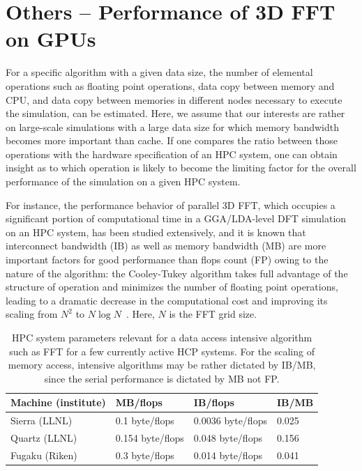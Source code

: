 
\section{Others -- Performance of 3D FFT on GPUs}
\label{sec:hpc}

For a specific algorithm with a given data size, the number of elemental operations such as floating point operations, data copy between memory and CPU, and data copy between memories in different nodes necessary to execute the simulation, can be estimated. Here, we assume that our interests are rather on large-scale simulations with a large data size for which memory bandwidth becomes more important than cache. If one compares the ratio between those operations with the hardware specification of an HPC system, one can obtain insight as to which operation is likely to become the limiting factor for the overall performance of the simulation on a given HPC system. 

For instance, the performance behavior of parallel 3D FFT, which occupies a significant portion of computational time in a GGA/LDA-level DFT simulation on an HPC system, has been studied extensively, and it is known that interconnect bandwidth (IB) as well as memory bandwidth (MB) are more important factors for good performance than flops count (FP) owing to the nature of the algorithm: the Cooley-Tukey algorithm takes full advantage of the structure of operation and minimizes the number of floating point operations, leading to a dramatic decrease in the computational cost and improving its scaling from $N^2$ to $N\log{N}$~\cite{cooley1965}. Here, $N$ is the FFT grid size.

\begin{table}[ht]
    \centering
    \begin{tabular}{|l|lll|}
    \hline
        Machine (institute) &  MB/flops & IB/flops & IB/MB \\
        \hline
        Sierra (LLNL) &  0.1 byte/flops & 0.0036 byte/flops & 0.025 \\
        Quartz (LLNL) & 0.154 byte/flops & 0.048 byte/flops & 0.156\\
        Fugaku (Riken) &  0.3 byte/flops & 0.014 byte/flops  & 0.041 \\
        \hline
    \end{tabular}
    \caption{HPC system parameters relevant for a data access intensive algorithm such as FFT for a few currently active HCP systems. For the scaling of memory access, intensive algorithms may be rather dictated by IB/MB, since the serial performance is dictated by MB not FP.}
    \label{tab:hpc_performance}
\end{table}

